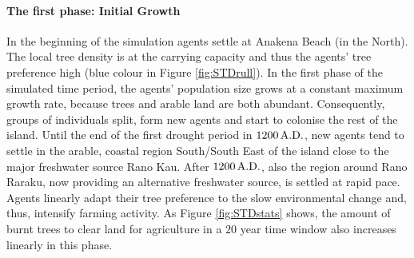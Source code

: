 \paragraph{The first phase: Initial Growth}
In the beginning of the simulation agents settle at Anakena Beach (in the North). 
The local tree density is at the carrying capacity and thus the agents' tree preference high (blue colour in Figure \ref{fig:STDrull}).
In the first phase of the simulated time period, the agents' population size grows at a constant maximum growth rate, because trees and arable land are both abundant. 
Consequently, groups of individuals split, form new agents and start to colonise the rest of the island.%
Until the end of the first drought period in $1200\, {\rm A.D.}$, new agents tend to settle in the arable, coastal region South/South East of the island close to the major freshwater source Rano Kau. 
After $1200\, {\rm A.D.}$, also the region around Rano Raraku, now providing an alternative freshwater source, is settled at rapid pace.
Agents linearly adapt their tree preference to the slow environmental change and, thus, intensify farming activity.
As Figure \ref{fig:STDstats} shows, the amount of burnt trees to clear land for agriculture in a $20$ year time window also increases linearly in this phase.

